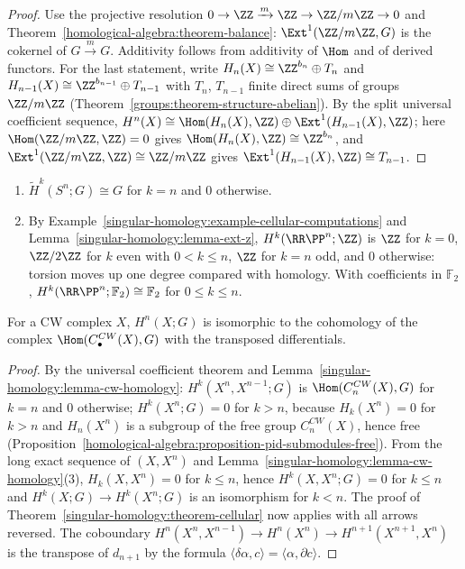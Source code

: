 \begin{proof}
Use the projective resolution $0 \to \ZZ \xrightarrow{m} \ZZ \to \ZZ/m\ZZ \to 0$ and Theorem~\ref{homological-algebra:theorem-balance}: $\Ext^1(\ZZ/m\ZZ, G)$ is the cokernel of
$G \xrightarrow{m} G$. Additivity follows from additivity of $\Hom$ and of derived functors. For the last statement, write $H_n(X) \cong \ZZ^{b_n} \oplus T_n$ and $H_{n-1}(X) \cong \ZZ^{b_{n-1}} \oplus T_{n-1}$ with $T_n$, $T_{n-1}$ finite direct sums of groups
$\ZZ/m\ZZ$ (Theorem~\ref{groups:theorem-structure-abelian}). By the split universal coefficient sequence,
$H^n(X) \cong \Hom(H_n(X), \ZZ) \oplus \Ext^1(H_{n-1}(X), \ZZ)$; here $\Hom(\ZZ/m\ZZ, \ZZ) = 0$ gives $\Hom(H_n(X), \ZZ) \cong \ZZ^{b_n}$, and
$\Ext^1(\ZZ/m\ZZ, \ZZ) \cong \ZZ/m\ZZ$ gives $\Ext^1(H_{n-1}(X), \ZZ) \cong T_{n-1}$.
\end{proof}

\begin{example}\label{singular-homology:example-cohomology-groups}
\begin{enumerate}
\item $\tilde{H}^k(S^n; G) \cong G$ for $k = n$ and $0$ otherwise.
\item By Example~\ref{singular-homology:example-cellular-computations} and Lemma~\ref{singular-homology:lemma-ext-z}, $H^k(\RR\PP^n; \ZZ)$ is $\ZZ$ for $k = 0$, $\ZZ/2\ZZ$ for
$k$ even with $0 < k \leq n$, $\ZZ$ for $k = n$ odd, and $0$ otherwise: torsion moves up one degree compared with homology. With coefficients in $\mathbb{F}_2$,
$H^k(\RR\PP^n; \mathbb{F}_2) \cong \mathbb{F}_2$ for $0 \leq k \leq n$.
\end{enumerate}
\end{example}

\begin{theorem}\label{singular-homology:theorem-cellular-singular-cohomology}
For a CW complex $X$, $H^n(X; G)$ is isomorphic to the cohomology of the complex $\Hom(C^{CW}_\bullet(X), G)$ with the transposed differentials.
\end{theorem}

\begin{proof}
By the universal coefficient theorem and Lemma~\ref{singular-homology:lemma-cw-homology}: $H^k(X^n, X^{n-1}; G)$ is $\Hom(C^{CW}_n(X), G)$ for $k = n$ and $0$ otherwise;
$H^k(X^n; G) = 0$ for $k > n$, because $H_k(X^n) = 0$ for $k > n$ and $H_n(X^n)$ is a subgroup of the free group $C^{CW}_n(X)$, hence free
(Proposition~\ref{homological-algebra:proposition-pid-submodules-free}). From the long exact sequence of $(X, X^n)$ and
Lemma~\ref{singular-homology:lemma-cw-homology}(3), $H_k(X, X^n) = 0$ for $k \leq n$, hence $H^k(X, X^n; G) = 0$ for $k \leq n$ and $H^k(X; G) \to H^k(X^n; G)$ is an
isomorphism for $k < n$. The proof of Theorem~\ref{singular-homology:theorem-cellular} now applies with all arrows reversed. The coboundary
$H^n(X^n, X^{n-1}) \to H^n(X^n) \to H^{n+1}(X^{n+1}, X^n)$ is the transpose of $d_{n+1}$ by the formula $\langle\delta\alpha, c\rangle = \langle\alpha, \partial c\rangle$.
\end{proof}

